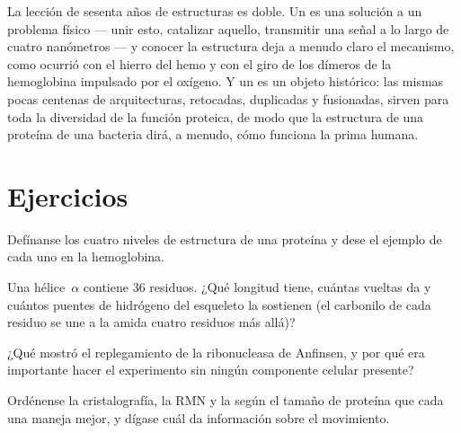 \begin{remark}\label{rem:b3:structural-biology:sf}
La lección de sesenta años de estructuras es doble. Un  es una
solución a un problema físico --- unir esto, catalizar aquello,
transmitir una señal a lo largo de cuatro nanómetros --- y conocer la
estructura deja a menudo claro el mecanismo, como ocurrió con el hierro
del hemo y con el giro de los dímeros de la hemoglobina impulsado por el
oxígeno. Y un  es un objeto histórico: las mismas pocas
centenas de arquitecturas, retocadas, duplicadas y fusionadas, sirven
para toda la diversidad de la función proteica, de modo que la estructura
de una proteína de una bacteria dirá, a menudo, cómo funciona la prima
humana.
\end{remark}

\section{Ejercicios}

\begin{exercise}[$\star$]\label{exo:b3:structural-biology:1}
Defínanse los cuatro niveles de estructura de una proteína y dese el
ejemplo de cada uno en la hemoglobina.
\end{exercise}

\begin{exercise}[$\star$]\label{exo:b3:structural-biology:2}
Una hélice~$\alpha$ contiene $36$ residuos. ¿Qué longitud tiene, cuántas
vueltas da y cuántos puentes de hidrógeno del esqueleto la sostienen
(el carbonilo de cada residuo se une a la amida cuatro residuos más
allá)?
\end{exercise}

\begin{exercise}[$\star$]\label{exo:b3:structural-biology:3}
¿Qué mostró el replegamiento de la ribonucleasa de Anfinsen, y por qué
era importante hacer el experimento sin ningún componente celular
presente?
\end{exercise}

\begin{exercise}[$\star$]\label{exo:b3:structural-biology:4}
Ordénense la cristalografía, la RMN y la 
según el tamaño de proteína que cada una maneja mejor, y dígase cuál da
información sobre el movimiento.
\end{exercise}

